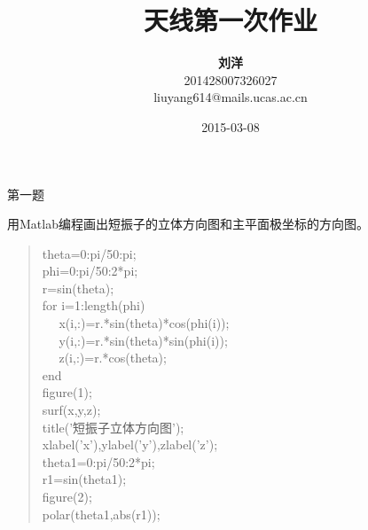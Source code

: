 \documentclass[a4paper,12pt]{article}
\begin{document}
\title{天线第一次作业}
\author{\textbf{刘洋} \\ 201428007326027 \\
liuyang614@mails.ucas.ac.cn\\{}}
\date{2015-03-08}
\maketitle

\newpage
\textcolor[rgb]{0,0,1}{\huge{第一题}}
\begin{flushleft} %
用Matlab编程画出短振子的立体方向图和主平面极坐标的方向图。
\end{flushleft}


\begin{verse} 
theta=0:pi/50:pi;\\
phi=0:pi/50:2*pi;\\
r=sin(theta);\\
for i=1:length(phi)\\
$\quad$ x(i,:)=r.*sin(theta)*cos(phi(i));\\
$\quad$	y(i,:)=r.*sin(theta)*sin(phi(i));\\
$\quad$	z(i,:)=r.*cos(theta);\\
end\\
figure(1);\\
surf(x,y,z);\\
title('短振子立体方向图');\\
xlabel('x'),ylabel('y'),zlabel('z');\\
theta1=0:pi/50:2*pi;\\
r1=sin(theta1);\\
figure(2);\\
polar(theta1,abs(r1));\\

\end{verse}





\end{document}
